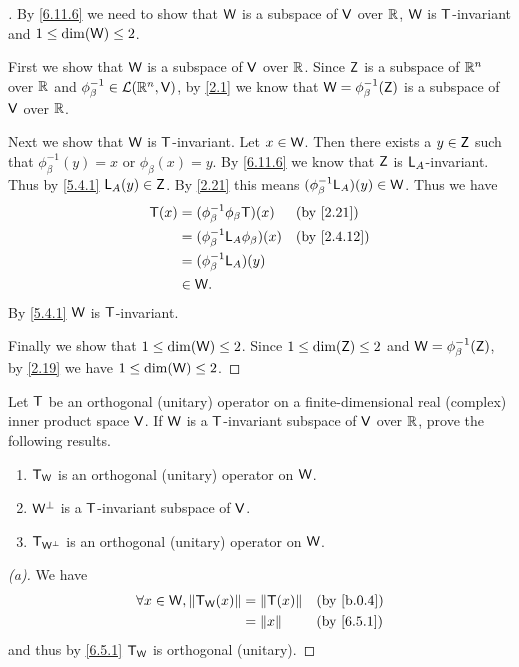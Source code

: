 \begin{proof}[]
  By \cref{6.11.6} we need to show that \(\mathsf{W}\) is a subspace of \(\mathsf{V}\) over \(\mathbb{R}\), \(\mathsf{W}\) is \(\mathsf{T}\)-invariant and \(1 \leq \dim(\mathsf{W}) \leq 2\).

  First we show that \(\mathsf{W}\) is a subspace of \(\mathsf{V}\) over \(\mathbb{R}\).
  Since \(\mathsf{Z}\) is a subspace of \(\mathbb{R}^n\) over \(\mathbb{R}\) and \(\phi_{\beta}^{-1} \in \mathcal{L}(\mathbb{R}^n, \mathsf{V})\), by \cref{2.1} we know that \(\mathsf{W} = \phi_{\beta}^{-1}(\mathsf{Z})\) is a subspace of \(\mathsf{V}\) over \(\mathbb{R}\).

  Next we show that \(\mathsf{W}\) is \(\mathsf{T}\)-invariant.
  Let \(x \in \mathsf{W}\).
  Then there exists a \(y \in \mathsf{Z}\) such that \(\phi_{\beta}^{-1}(y) = x\) or \(\phi_{\beta}(x) = y\).
  By \cref{6.11.6} we know that \(\mathsf{Z}\) is \(\mathsf{L}_A\)-invariant.
  Thus by \cref{5.4.1} \(\mathsf{L}_A(y) \in \mathsf{Z}\).
  By \cref{2.21} this means \((\phi_{\beta}^{-1} \mathsf{L}_A)(y) \in \mathsf{W}\).
  Thus we have
  \begin{align*}
    \T(x) & = (\phi_{\beta}^{-1} \phi_{\beta} \T)(x)   &  & \by{2.21}   \\
          & = (\phi_{\beta}^{-1} \L_A \phi_{\beta})(x) &  & \by{2.4.12} \\
          & = (\phi_{\beta}^{-1} \L_A)(y)                               \\
          & \in \W.
  \end{align*}
  By \cref{5.4.1} \(\mathsf{W}\) is \(\mathsf{T}\)-invariant.

  Finally we show that \(1 \leq \dim(\mathsf{W}) \leq 2\).
  Since \(1 \leq \dim(\mathsf{Z}) \leq 2\) and \(\mathsf{W} = \phi_{\beta}^{-1}(\mathsf{Z})\), by \cref{2.19} we have \(1 \leq \dim(\mathsf{W}) \leq 2\).
\end{proof}

\begin{ex}\label{ex:6.11.14}
  Let \(\mathsf{T}\) be an orthogonal (unitary) operator on a finite-dimensional real (complex) inner product space \(\mathsf{V}\).
  If \(\mathsf{W}\) is a \(\mathsf{T}\)-invariant subspace of \(\mathsf{V}\) over \(\mathbb{R}\), prove the following results.
  \begin{enumerate}
    \item \(\mathsf{T}_{\mathsf{W}}\) is an orthogonal (unitary) operator on \(\mathsf{W}\).
    \item \(\mathsf{W}^{\perp}\) is a \(\mathsf{T}\)-invariant subspace of \(\mathsf{V}\).
    \item \(\mathsf{T}_{\mathsf{W}^{\perp}}\) is an orthogonal (unitary) operator on \(\mathsf{W}\).
  \end{enumerate}
\end{ex}

\begin{proof}[(a)]
  We have
  \begin{align*}
    \forall x \in \W, \norm{\T_{\W}(x)} & = \norm{\T(x)} &  & \by{b.0.4} \\
                                        & = \norm{x}     &  & \by{6.5.1}
  \end{align*}
  and thus by \cref{6.5.1} \(\mathsf{T}_{\mathsf{W}}\) is orthogonal (unitary).
\end{proof}

